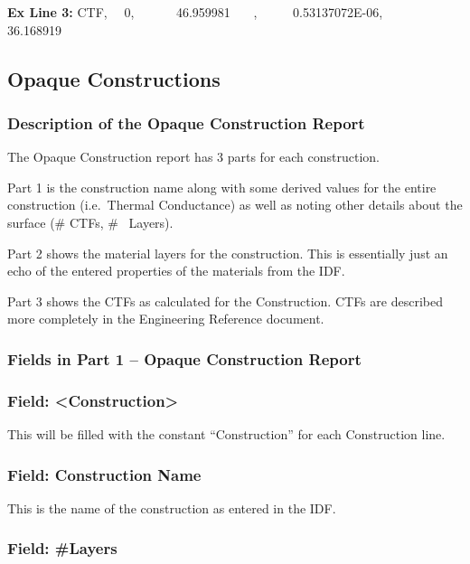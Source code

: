 \textbf{Ex Line 3:} CTF,~~ 0,~~~~~~ 46.959981~~~ ,~~~~~ 0.53137072E-06,~~~~~~ 36.168919~~~

\subsection{Opaque Constructions}\label{opaque-constructions}

\subsubsection{Description of the Opaque Construction Report}\label{description-of-the-opaque-construction-report}

The Opaque Construction report has 3 parts for each construction.

Part 1 is the construction name along with some derived values for the entire construction (i.e.~Thermal Conductance) as well as noting other details about the surface (\# CTFs, \#~ Layers).

Part 2 shows the material layers for the construction. This is essentially just an echo of the entered properties of the materials from the IDF.

Part 3 shows the CTFs as calculated for the Construction. CTFs are described more completely in the Engineering Reference document.

\subsubsection{Fields in Part 1 -- Opaque Construction Report}\label{fields-in-part-1-opaque-construction-report}

\subsubsection{Field: \textless{}Construction\textgreater{}}\label{field-construction-1}

This will be filled with the constant ``Construction'' for each Construction line.

\subsubsection{Field: Construction Name}\label{field-construction-name}

This is the name of the construction as entered in the IDF.

\subsubsection{Field: \#Layers}\label{field-layers}


